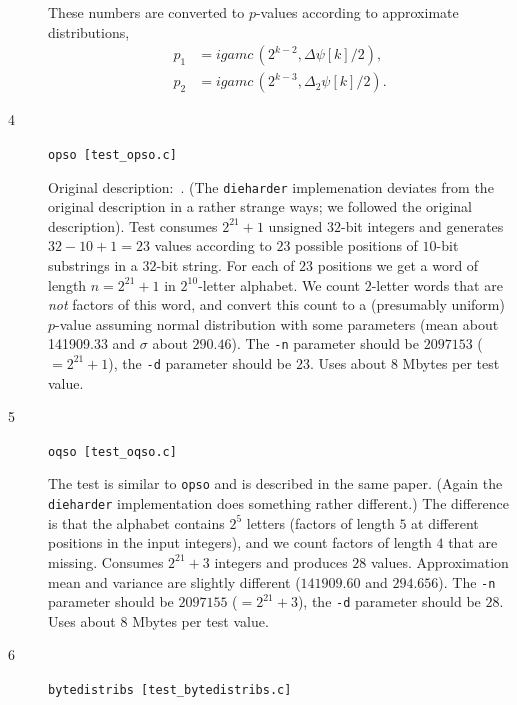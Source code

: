 \documentclass[12pt,a4paper,fullpage]{article}
\begin{document}
\begin{description}
These numbers are converted to $p$-values according to approximate distributions,
\begin{align*}
    p_1 &= \textit{igamc}\,(2^{k-2},\Delta\psi[k]/2),\\
    p_2 &= \textit{igamc}\,(2^{k-3},\Delta_2\psi[k]/2).
\end{align*}   

\item[4] \texttt{opso [test\_opso.c]}

Original description:~\cite{marsaglia-zaman}. (The \texttt{dieharder} implemenation deviates from the original description in a rather strange ways; we followed the original description). Test consumes $2^{21}+1$ unsigned $32$-bit integers and generates $32-10+1=23$ values according to $23$ possible positions of $10$-bit substrings in a $32$-bit string. For each of $23$ positions we get a word of length $n=2^{21}+1$ in $2^{10}$-letter alphabet. We count $2$-letter words that are \emph{not} factors of this word, and convert this count to a  (presumably uniform) $p$-value assuming normal distribution with some parameters (mean about 141909.33 and $\sigma$ about $290.46$). The \texttt{-n} parameter should be $2097153$ (${}=2^{21}+1$), the \texttt{-d} parameter should be $23$. Uses about $8$ Mbytes per test value.

\item[5] \texttt{oqso [test\_oqso.c]}

The test is similar to \texttt{opso} and is described in the same paper. (Again the \texttt{dieharder} implementation does something rather different.) The difference is that the alphabet contains $2^5$ letters (factors of length $5$ at different positions in the input integers), and we count factors of length $4$ that are missing. Consumes $2^{21}+3$ integers and produces $28$ values. Approximation mean and variance are slightly different ($141909.60$ and $294.656$). The \texttt{-n} parameter should be $2097155$ (${}=2^{21}+3$), the \texttt{-d} parameter should be $28$. Uses about $8$ Mbytes per test value.

\item[6] \texttt{bytedistribs [test\_bytedistribs.c]}


\end{description}
\end{document}
